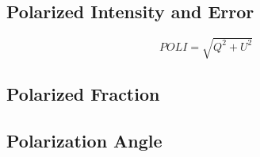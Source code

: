 \subsection{Polarized Intensity and Error}

\begin{equation}
    POLI = \sqrt{Q^2 + U^2}
\end{equation}


\subsection{Polarized Fraction}


\subsection{Polarization Angle}